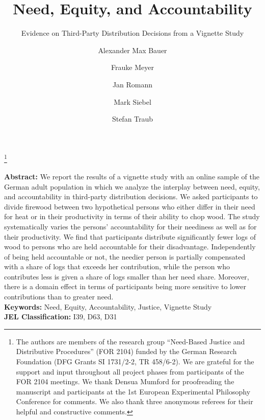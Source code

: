 \documentclass[smallcondensed]{svjour3}
\begin{document}
\title{Need, Equity, and Accountability}
\subtitle{Evidence on Third-Party Distribution Decisions from a Vignette Study}
\author{Alexander Max Bauer \and Frauke Meyer \and Jan Romann \and Mark Siebel \and Stefan Traub}
\thanks{The authors are members of the research group ``Need-Based Justice and Distributive Procedures'' (FOR 2104) funded by the German Research Foundation (DFG Grants SI 1731/2-2, TR 458/6-2). We are grateful for the support and input throughout all project phases from participants of the FOR 2104 meetings. We thank Densua Mumford for proofreading the manuscript and participants at the 1st European Experimental Philosophy Conference for comments. We also thank three anonymous referees for their helpful and constructive comments.}
\maketitle
%
\noindent\textbf{Abstract:} We report the results of a vignette study with an online sample of the German adult population in which we analyze the interplay between need, equity, and accountability in third-party distribution decisions. We asked participants to divide firewood between two hypothetical persons who either differ in their need for heat or in their productivity in terms of their ability to chop wood. The study systematically varies the persons' accountability for their neediness as well as for their productivity. We find that participants distribute significantly fewer logs of wood to persons who are held accountable for their disadvantage. Independently of being held accountable or not, the needier person is partially compensated with a share of logs that exceeds her contribution, while the person who contributes less is given a share of logs smaller than her need share. Moreover, there is a domain effect in terms of participants being more sensitive to lower contributions than to greater need.\\[0.5ex]
%
\noindent\textbf{Keywords:} Need, Equity, Accountability, Justice, Vignette Study\\
\textbf{JEL Classification:} I39, D63, D31
%
\end{document}
